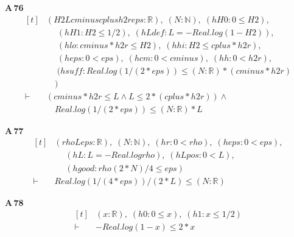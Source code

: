 \noindent\textbf{A\,76}\quad{}
{\footnotesize\[ \begin{aligned}[t]
&(\mathit{H2} \mathit{L} \mathit{cminus} \mathit{cplus} \mathit{h2r} \mathit{eps} : \mathbb{R} ),\; (\mathit{N} : \mathbb{N} ),\; (\mathit{hH0} : 0 \leq \mathit{H2}),\\
&\quad \; (\mathit{hH1} : \mathit{H2} \leq 1/2),\; (\mathit{hLdef} : \mathit{L} = -\mathit{Real}.\mathit{log} (1 - \mathit{H2})),\\
&\quad \; (\mathit{hlo} : \mathit{cminus} * \mathit{h2r} \leq \mathit{H2}),\; (\mathit{hhi} : \mathit{H2} \leq \mathit{cplus} * \mathit{h2r}),\\
&\quad \; (\mathit{heps} : 0 < \mathit{eps}),\; (\mathit{hcm} : 0 < \mathit{cminus}),\; (\mathit{hh} : 0 < \mathit{h2r}),\\
&\quad \; (\mathit{hsuff} : \mathit{Real}.\mathit{log} (1 / (2 * \mathit{eps})) \leq (\mathit{N} : \mathbb{R} ) * (\mathit{cminus} * \mathit{h2r})\\
&\quad )\\
\vdash\;&(\mathit{cminus} * \mathit{h2r} \leq \mathit{L} \wedge \mathit{L} \leq 2 * (\mathit{cplus} * \mathit{h2r})) \wedge\\
&\quad \mathit{Real}.\mathit{log} (1 / (2 * \mathit{eps})) \leq (\mathit{N} : \mathbb{R} ) * \mathit{L}
\end{aligned} \]}

\noindent\textbf{A\,77}\quad{}
{\footnotesize\[ \begin{aligned}[t]
&(\mathit{rho} \mathit{L} \mathit{eps} : \mathbb{R} ),\; (\mathit{N} : \mathbb{N} ),\; (\mathit{hr} : 0 < \mathit{rho}),\; (\mathit{heps} : 0 < \mathit{eps}),\\
&\quad \; (\mathit{hL} : \mathit{L} = -\mathit{Real}.\mathit{log} \mathit{rho}),\; (\mathit{hLpos} : 0 < \mathit{L}),\\
&\quad \; (\mathit{hgood} : \mathit{rho} ^{} (2 * \mathit{N}) / 4 \leq \mathit{eps})\\
\vdash\;&\mathit{Real}.\mathit{log} (1 / (4 * \mathit{eps})) / (2 * \mathit{L}) \leq (\mathit{N} : \mathbb{R} )
\end{aligned} \]}

\noindent\textbf{A\,78}\quad{}
{\footnotesize\[ \begin{aligned}[t]
&(\mathit{x} : \mathbb{R} ),\; (\mathit{h0} : 0 \leq \mathit{x}),\; (\mathit{h1} : \mathit{x} \leq 1/2)\\
\vdash\;&-\mathit{Real}.\mathit{log} (1 - \mathit{x}) \leq 2 * \mathit{x}
\end{aligned} \]}

